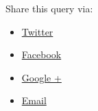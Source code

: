 \documentclass[
]{article}
\providecommand{\tightlist}{%
  \setlength{\itemsep}{0pt}\setlength{\parskip}{0pt}}
\begin{document}
\hypertarget{widget-share-panel}{}
Share this query via:

\begin{itemize}
\tightlist
\item
  \href{Javascript:Widgettwitter();}{{}\protect\hypertarget{sTwitter}{}{Twitter}}
\item
  \href{Javascript:Widgetfacebook();}{{}\protect\hypertarget{sFaceBook}{}{Facebook}}
\item
  \href{Javascript:WidgetGooglePlus();}{{}\protect\hypertarget{sGooglePlus}{}{Google
  +}}
\item
  \href{Javascript:WidgetEmail();}{{}\protect\hypertarget{sEmail}{}{Email}}
\end{itemize}

\hypertarget{divreportcontent}{}
\hypertarget{widget}{}
\hypertarget{widgetOptions}{}
\hypertarget{embedLinks}{}
\end{document}
